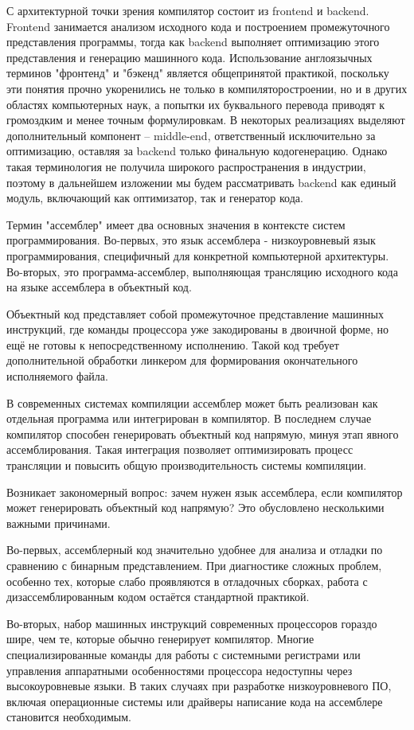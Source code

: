 С архитектурной точки зрения компилятор состоит из frontend и backend. Frontend занимается анализом исходного кода и построением промежуточного представления программы, тогда как backend выполняет оптимизацию этого представления и генерацию машинного кода. Использование англоязычных терминов "фронтенд" и "бэкенд" является общепринятой практикой, поскольку эти понятия прочно укоренились не только в компиляторостроении, но и в других областях компьютерных наук, а попытки их буквального перевода приводят к громоздким и менее точным формулировкам. В некоторых реализациях выделяют дополнительный компонент -- middle-end, ответственный исключительно за оптимизацию, оставляя за backend только финальную кодогенерацию. Однако такая терминология не получила широкого распространения в индустрии, поэтому в дальнейшем изложении мы будем рассматривать backend как единый модуль, включающий как оптимизатор, так и генератор кода.

Термин "ассемблер" имеет два основных значения в контексте систем программирования. Во-первых, это язык ассемблера - низкоуровневый язык программирования, специфичный для конкретной компьютерной архитектуры. Во-вторых, это программа-ассемблер, выполняющая трансляцию исходного кода на языке ассемблера в объектный код.

Объектный код представляет собой промежуточное представление машинных инструкций, где команды процессора уже закодированы в двоичной форме, но ещё не готовы к непосредственному исполнению. Такой код требует дополнительной обработки линкером для формирования окончательного исполняемого файла.

В современных системах компиляции ассемблер может быть реализован как отдельная программа или интегрирован в компилятор. В последнем случае компилятор способен генерировать объектный код напрямую, минуя этап явного ассемблирования. Такая интеграция позволяет оптимизировать процесс трансляции и повысить общую производительность системы компиляции.

Возникает закономерный вопрос: зачем нужен язык ассемблера, если компилятор может генерировать объектный код напрямую? Это обусловлено несколькими важными причинами.

Во-первых, ассемблерный код значительно удобнее для анализа и отладки по сравнению с бинарным представлением. При диагностике сложных проблем, особенно тех, которые слабо проявляются в отладочных сборках, работа с дизассемблированным кодом остаётся стандартной практикой.

Во-вторых, набор машинных инструкций современных процессоров гораздо шире, чем те, которые обычно генерирует компилятор. Многие специализированные команды  для работы с системными регистрами или управления аппаратными особенностями процессора недоступны через высокоуровневые языки. В таких случаях при разработке низкоуровневого ПО, включая операционные системы или драйверы написание кода на ассемблере становится необходимым.

